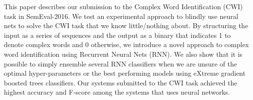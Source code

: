 This paper describes our submission to the Complex Word Identification (CWI) task in SemEval-2016. We test an experimental approach to blindly use neural nets to solve the CWI task that we know little/nothing about. By structuring the input as a series of sequences and the output as a binary that indicates 1 to denote complex words and 0 otherwise, we introduce a novel approach to complex word identification using Recurrent Neural Nets (RNN). We also show that it is possible to simply ensemble several RNN classifiers when we are unsure of the optimal hyper-parameters or the best performing models using eXtreme gradient boosted trees classifiers. Our systems submitted to the CWI task achieved the highest accuracy and F-score among the systems that uses neural networks.
